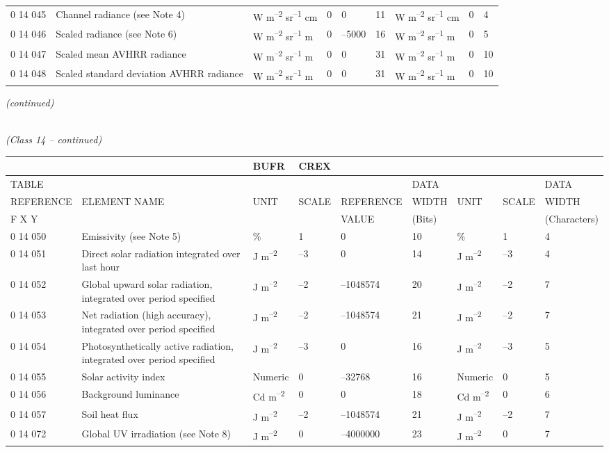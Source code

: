 \begin{longtable}[]{@{}lllllllll@{}}
0 14 045 & Channel radiance (see Note 4) & W m\textsuperscript{--2} sr\textsuperscript{--1} cm & 0 & 0 & 11 & W m\textsuperscript{--2} sr\textsuperscript{--1} cm & 0 & 4\tabularnewline
0 14 046 & Scaled radiance (see Note 6) & W m\textsuperscript{--2} sr\textsuperscript{--1} m & 0 & --5000 & 16 & W m\textsuperscript{--2} sr\textsuperscript{--1} m & 0 & 5\tabularnewline
0 14 047 & Scaled mean AVHRR radiance & W m\textsuperscript{--2} sr\textsuperscript{--1} m & 0 & 0 & 31 & W m\textsuperscript{--2} sr\textsuperscript{--1} m & 0 & 10\tabularnewline
0 14 048 & Scaled standard deviation AVHRR radiance & W m\textsuperscript{--2} sr\textsuperscript{--1} m & 0 & 0 & 31 & W m\textsuperscript{--2} sr\textsuperscript{--1} m & 0 & 10\tabularnewline
\bottomrule
\end{longtable}

\emph{(continued)}

\emph{\\
(Class 14 -- continued)}

\begin{longtable}[]{@{}lllllllll@{}}
\toprule
& & BUFR & CREX & & & & &\tabularnewline
\midrule
\endhead
TABLE & & & & & DATA & & & DATA\tabularnewline
REFERENCE & ELEMENT NAME & UNIT & SCALE & REFERENCE & WIDTH & UNIT & SCALE & WIDTH\tabularnewline
F X Y & & & & VALUE & (Bits) & & & (Characters)\tabularnewline
0 14 050 & Emissivity (see Note 5) & \% & 1 & 0 & 10 & \% & 1 & 4\tabularnewline
0 14 051 & Direct solar radiation integrated over last hour & J m\textsuperscript{--2} & --3 & 0 & 14 & J m\textsuperscript{--2} & --3 & 4\tabularnewline
0 14 052 & Global upward solar radiation, integrated over period specified & J m\textsuperscript{--2} & --2 & --1048574 & 20 & J m\textsuperscript{--2} & --2 & 7\tabularnewline
0 14 053 & Net radiation (high accuracy), integrated over period specified & J m\textsuperscript{--2} & --2 & --1048574 & 21 & J m\textsuperscript{--2} & --2 & 7\tabularnewline
0 14 054 & Photosynthetically active radiation, integrated over period specified & J m\textsuperscript{--2} & --3 & 0 & 16 & J m\textsuperscript{--2} & --3 & 5\tabularnewline
0 14 055 & Solar activity index & Numeric & 0 & --32768 & 16 & Numeric & 0 & 5\tabularnewline
0 14 056 & Background luminance & Cd m\textsuperscript{--2} & 0 & 0 & 18 & Cd m\textsuperscript{--2} & 0 & 6\tabularnewline
0 14 057 & Soil heat flux & J m\textsuperscript{--2} & --2 & --1048574 & 21 & J m\textsuperscript{--2} & --2 & 7\tabularnewline
0 14 072 & Global UV irradiation (see Note 8) & J m\textsuperscript{--2} & 0 & --4000000 & 23 & J m\textsuperscript{--2} & 0 & 7\tabularnewline
\bottomrule
\end{longtable}

